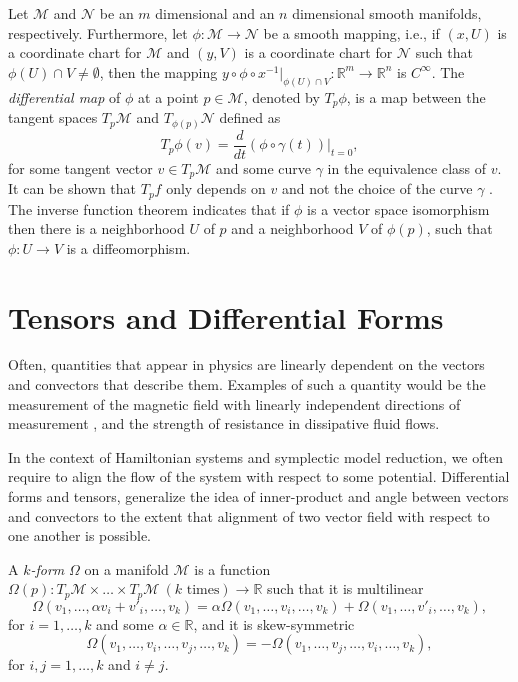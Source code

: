 Let $\mathcal M$ and $\mathcal N$ be an $m$ dimensional and an $n$ dimensional smooth manifolds, respectively. Furthermore, let $\phi:\mathcal M\to \mathcal N$ be a smooth mapping, i.e., if $(x,U)$ is a coordinate chart for $\mathcal M$ and $(y,V)$ is a coordinate chart for $\mathcal N$ such that $\phi(U)\cap V\neq \emptyset$, then the mapping $y\circ \phi \circ x^{-1}|_{\phi(U)\cap V}:\mathbb R^{m}\to \mathbb R^{n}$ is $C^{\infty}$. The \emph{differential map} of $\phi$ at a point $p\in \mathcal M$, denoted by $T_{p}\phi$, is a map between the tangent spaces $T_p \mathcal M$ and $T_{\phi(p)} \mathcal N$ defined as
\begin{equation} \label{eq:2.4}
	T_p \phi(v) = \frac{d}{dt}(\phi\circ \gamma(t))|_{t=0},
\end{equation}
for some tangent vector $v\in T_{p} \mathcal M$ and some curve $\gamma$ in the equivalence class of $v$. It can be shown that $T_p f$ only depends on $v$ and not the choice of the curve $\gamma$ \cite{robbin2011introduction}. The inverse function theorem \cite{rudin1976principles} indicates that if $\phi$ is a vector space isomorphism then there is a neighborhood $U$ of $p$ and a neighborhood $V$ of $\phi(p)$, such that $\phi:U\to V$ is a diffeomorphism.

\section{Tensors and Differential Forms} \label{section:2.2}
Often, quantities that appear in physics are linearly dependent on the vectors and convectors that describe them. Examples of such a quantity would be the measurement of the magnetic field with linearly independent directions of measurement \cite{Wald:106274}, and the strength of resistance in dissipative fluid flows. 

In the context of Hamiltonian systems and symplectic model reduction, we often require to align the flow of the system with respect to some potential. Differential forms and tensors, generalize the idea of inner-product and angle between vectors and convectors to the extent that  alignment of two vector field with respect to one another is possible.

\begin{definition}
A \emph{$k$-form} $\Omega$ on a manifold $\mathcal M$ is a function $\Omega(p): T_p\mathcal M \times \dots \times T_p\mathcal M \ (k \text{ times}) \to \mathbb R$ such that it is multilinear
\[
	\Omega(v_1,\dots,\alpha v_i + v'_i, \dots, v_k) = \alpha \Omega(v_1,\dots,v_i, \dots, v_k) + \Omega(v_1,\dots,v'_i, \dots, v_k),
\]
for $i=1,\dots,k$ and some $\alpha \in \mathbb R$, and it is skew-symmetric
\[
	\Omega(v_1,\dots,v_i,\dots,v_j, \dots, v_k) = - \Omega(v_1,\dots,v_j,\dots,v_i, \dots, v_k),
\]
for $i,j=1,\dots,k$ and $i\neq j$.
\end{definition}

